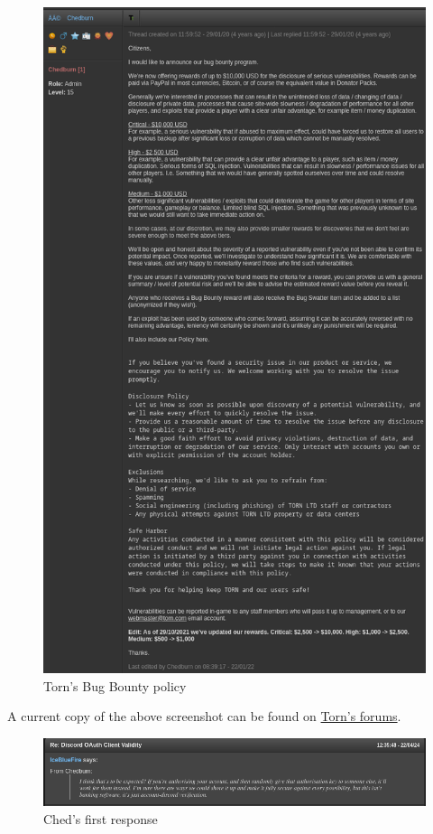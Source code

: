 \documentclass{article}
\begin{document}
{\begin{figure}[h!]
	\centering
	\includegraphics[scale=0.2]{torn-disclosure-policy.png}
	\caption{Torn's Bug Bounty policy}
	\label{fig:bug-bounty-policy}
\end{figure}

A current copy of the above screenshot can be found on \href{https://www.torn.com/forums.php#/p=threads&f=1&t=16141356&b=0&a=0}{Torn's forums}.

\begin{figure}[h!]
	\centering
	\includegraphics[scale=0.5]{ched-response-first.png}
	\caption{Ched's first response}
	\label{fig:ched-response-1}
\end{figure}

}
\end{document}
